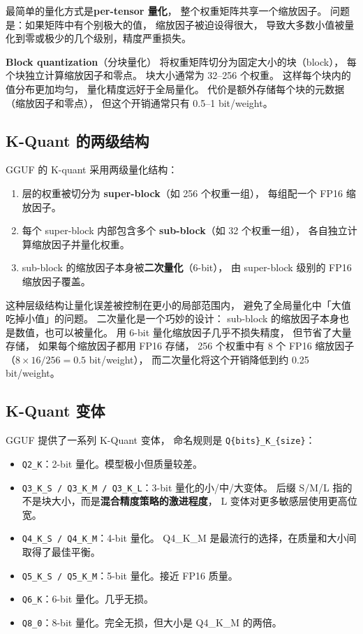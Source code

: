 最简单的量化方式是\textbf{per-tensor 量化}，
整个权重矩阵共享一个缩放因子。
问题是：如果矩阵中有个别极大的值，
缩放因子被迫设得很大，
导致大多数小值被量化到零或极少的几个级别，精度严重损失。

\textbf{Block quantization}（分块量化）
将权重矩阵切分为固定大小的块（block），
每个块独立计算缩放因子和零点。
块大小通常为 32--256 个权重。
这样每个块内的值分布更加均匀，
量化精度远好于全局量化。
代价是额外存储每个块的元数据（缩放因子和零点），
但这个开销通常只有 0.5--1 bit/weight。

\subsection{K-Quant 的两级结构}

GGUF 的 K-quant 采用两级量化结构：
\begin{enumerate}[noitemsep]
  \item 层的权重被切分为 \textbf{super-block}（如 256 个权重一组），
        每组配一个 FP16 缩放因子。
  \item 每个 super-block 内部包含多个 \textbf{sub-block}（如 32 个权重一组），
        各自独立计算缩放因子并量化权重。
  \item sub-block 的缩放因子本身被\textbf{二次量化}（6-bit），
        由 super-block 级别的 FP16 缩放因子覆盖。
\end{enumerate}

这种层级结构让量化误差被控制在更小的局部范围内，
避免了全局量化中「大值吃掉小值」的问题。
二次量化是一个巧妙的设计：
sub-block 的缩放因子本身也是数值，也可以被量化。
用 6-bit 量化缩放因子几乎不损失精度，
但节省了大量存储，
如果每个缩放因子都用 FP16 存储，
256 个权重中有 8 个 FP16 缩放因子（$8 \times 16 / 256 = 0.5$ bit/weight），
而二次量化将这个开销降低到约 0.25 bit/weight。

\subsection{K-Quant 变体}

GGUF 提供了一系列 K-Quant 变体，
命名规则是 \texttt{Q\{bits\}\_K\_\{size\}}：
\begin{itemize}[noitemsep]
  \item \texttt{Q2\_K}：2-bit 量化。模型极小但质量较差。
  \item \texttt{Q3\_K\_S / Q3\_K\_M / Q3\_K\_L}：3-bit 量化的小/中/大变体。
        后缀 S/M/L 指的不是块大小，而是\textbf{混合精度策略的激进程度}，
        L 变体对更多敏感层使用更高位宽。
  \item \texttt{Q4\_K\_S / Q4\_K\_M}：4-bit 量化。
        Q4\_K\_M 是最流行的选择，在质量和大小间取得了最佳平衡。
  \item \texttt{Q5\_K\_S / Q5\_K\_M}：5-bit 量化。接近 FP16 质量。
  \item \texttt{Q6\_K}：6-bit 量化。几乎无损。
  \item \texttt{Q8\_0}：8-bit 量化。完全无损，但大小是 Q4\_K\_M 的两倍。
\end{itemize}

